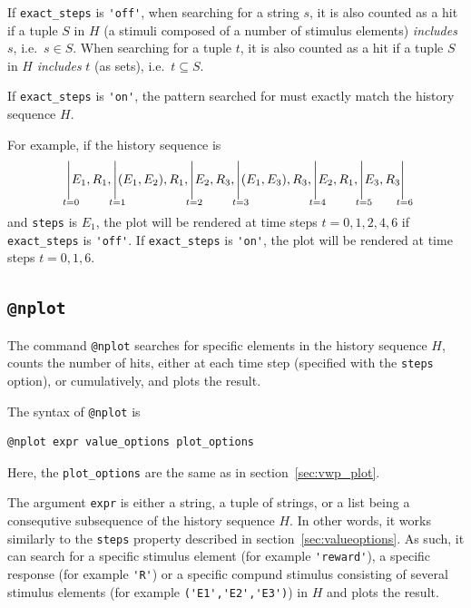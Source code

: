 \documentclass[11pt]{article}
\begin{document}
If \verb|exact_steps| is \verb|'off'|, when searching for a string $s$, it is also counted as a hit if a tuple $S$ in $H$ (a stimuli composed of a number of stimulus elements) \emph{includes} $s$, i.e.\ $s \in S$. When searching for a tuple $t$, it is also counted as a hit if a tuple $S$ in $H$ \emph{includes} $t$ (as sets), i.e.\ $t \subseteq S$.

If \verb|exact_steps| is \verb|'on'|, the pattern searched for must exactly match the history sequence $H$.

For example, if the history sequence is
\[
\Biggr|_{\mathclap{\substack{\\ \\ t=0}}} E_1, R_1,
\Biggr|_{\mathclap{\substack{\\ \\ t=1}}} (E_1,E_2), R_1,
\Biggr|_{\mathclap{\substack{\\ \\ t=2}}} E_2, R_3,
\Biggr|_{\mathclap{\substack{\\ \\ t=3}}} (E_1,E_3), R_3,
\Biggr|_{\mathclap{\substack{\\ \\ t=4}}} E_2, R_1,
\Biggr|_{\mathclap{\substack{\\ \\ t=5}}} E_3, R_3
\Biggr|_{\mathclap{\substack{\\ \\ t=6}}}
\]
and \verb|steps| is $E_1$, the plot will be rendered at time steps $t=0, 1, 2, 4, 6$ if \verb|exact_steps| is \verb|'off'|. If \verb|exact_steps| is \verb|'on'|, the plot will be rendered at time steps $t=0, 1, 6$.

\subsection{\texttt{@nplot}}
The command \verb|@nplot| searches for specific elements in the history sequence $H$, counts the number of hits, either at each time step (specified with the \verb|steps| option), or cumulatively, and plots the result. 

The syntax of \verb|@nplot| is
\begin{lstlisting}[caption={Syntax for \texttt{@nplot}}, label=lst:n_plot_syntax]
@nplot expr value_options plot_options
\end{lstlisting}
Here, the \verb|plot_options| are the same as in section~\ref{sec:vwp_plot}.

The argument \verb|expr| is either a string, a tuple of strings, or a list being a consequtive subsequence of the history sequence $H$. In other words, it works similarly to the \verb|steps| property described in section~\ref{sec:valueoptions}. As such, it can search for a specific stimulus element (for example \verb|'reward'|), a specific response (for example \verb|'R'|) or a specific compund stimulus consisting of several stimulus elements (for example \verb|('E1','E2','E3')|) in $H$ and plots the result. 
\end{document}
